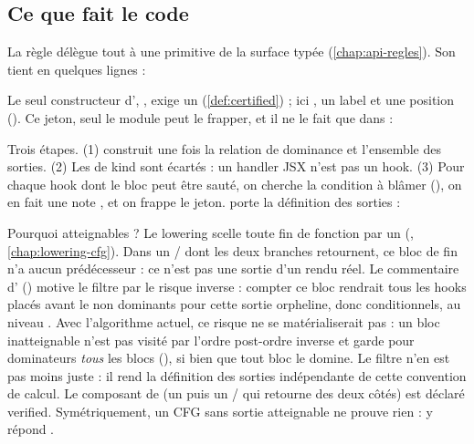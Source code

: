 \subsection{Ce que fait le code}

La règle délègue tout à une primitive de la surface typée (\cref{chap:api-regles}). Son  tient en quelques lignes :


Le seul constructeur d'\Error{}, , exige un  (\cref{def:certified}) ; ici , un label et une position (). Ce jeton, seul le module  peut le frapper, et il ne le fait que dans  :


Trois étapes. (1)  construit une fois la relation de dominance et l'ensemble des sorties. (2) Les  de kind  sont écartés : un handler JSX n'est pas un hook. (3) Pour chaque hook dont le bloc \og peut être sauté\fg{}, on cherche la condition à blâmer (), on en fait une note , et on frappe le jeton.  porte la définition des sorties :


\begin{piege}
Pourquoi \og atteignables\fg{} ? Le lowering scelle toute fin de fonction par un  (, \cref{chap:lowering-cfg}). Dans un / dont les deux branches retournent, ce bloc de fin n'a aucun prédécesseur : ce n'est pas une sortie d'un rendu réel. Le commentaire d' () motive le filtre par le risque inverse : compter ce bloc rendrait tous les hooks placés avant le  non dominants pour cette sortie orpheline, donc conditionnels, au niveau \Error. Avec l'algorithme actuel, ce risque ne se matérialiserait pas : un bloc inatteignable n'est pas visité par l'ordre post-ordre inverse et garde pour dominateurs \emph{tous} les blocs (), si bien que tout bloc le \og domine\fg{}. Le filtre n'en est pas moins juste : il rend la définition des sorties indépendante de cette convention de calcul. Le composant  de  (un  puis un / qui retourne des deux côtés) est déclaré \og verified\fg{}. Symétriquement, un CFG sans sortie atteignable ne prouve rien :  y répond .
\end{piege}

